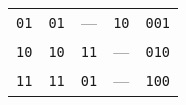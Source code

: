 \begin{table}[H]
\begin{NiceTabular}[t]{W{c}{2.3cm}cccW{c}{2cm}}
		\texttt{01}                          & \texttt{01}                       & ---                                                                                                                     & \texttt{10}                                    & \texttt{001}                     \\
		\texttt{10}                          & \texttt{10}                       & \texttt{11}                                                                                                             & ---                                            & \texttt{010}                     \\
		\texttt{11}                          & \texttt{11}                       & \texttt{01}                                                                                                             & ---                                            & \texttt{100}                     \\
		\bottomrule
	\end{NiceTabular}
\end{table}
